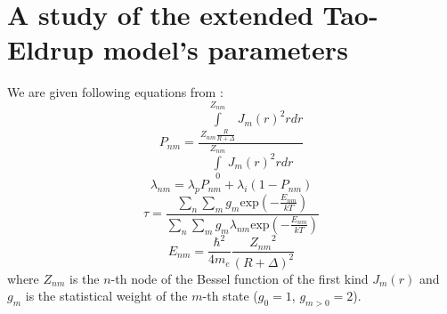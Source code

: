 \documentclass[a4paper]{article}
\begin{document}
	\section{A study of the extended Tao-Eldrup model's parameters}
		We are given following equations from \cite{Zaleski2015}:
		\begin{equation}
			P_{nm} = 
				\frac
					{\int\limits_{Z_{nm}\frac{R}{R+\Delta}}^{Z_{nm}}J_m(r)^2rdr}
					{\int\limits_0^{Z_{nm}}J_m(r)^2rdr}
		\end{equation}
		\begin{equation}
			\lambda_{nm} = \lambda_pP_{nm} + \lambda_i(1-P_{nm})
		\end{equation}
		\begin{equation}
			\tau =
				\frac
					{\sum\limits_n\sum\limits_mg_m\mathrm{exp}\left(-\frac{E_{nm}}{kT}\right)}
					{\sum\limits_n\sum\limits_mg_m\lambda_{nm}\mathrm{exp}\left(-\frac{E_{nm}}{kT}\right)}
		\end{equation}
		\begin{equation*}
			E_{nm} = \frac{\hbar^2}{4m_e}\frac{{Z_{nm}}^2}{(R+\Delta)^2}
		\end{equation*}
		where $Z_{nm}$ is the $n$-th node of the Bessel function of the
		first kind $J_m(r)$ and $g_m$ is the statistical weight of the $m$-th state
		($g_0 = 1$, $g_{m>0}=2$).

	
	
\end{document}
